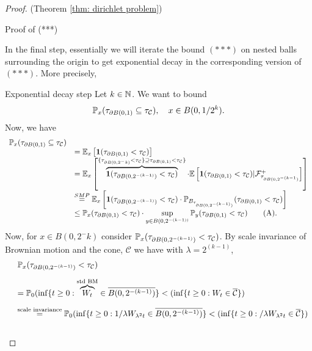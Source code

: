 \documentclass{article}
\begin{document}
\begin{proof}{(Theorem \ref{thm: dirichlet problem})}
\begin{examplesblock}{Proof of (***)}
\end{examplesblock}

In the final step, essentially we will iterate the bound $ (***)$ on nested balls surrounding the origin to get exponential decay in the corresponding version of $ (***)$. More precisely, 

\begin{examplesblock}{Exponential decay step}\label{aside: poincare cone decay bound}
Let $ k\in \mathbb{N}$. We want to bound 
\[
\mathbb{P}_{x}(\tau_{\partial B(0,1)}\subseteq \tau_{ \mathcal{C}}), \quad x\in B(0, 1/2^k).
\]
Now, we have 
\[
\begin{array}{ll}
	\mathbb{P}_{x}(\tau_{\partial B(0,1)}\subseteq \tau_{ \mathcal{C}})&\\ 
	&= \mathbb{E}_{x}\left[ \mathbf{1}(\tau_{\partial B(0,1)}<\tau_{\mathcal{C}}) \right] \\
								&= \mathbb{E}_{x}\left[ \overbrace{\mathbf{1}(\tau_{\partial B(0,2^{-(k-1)})}<\tau_{\mathcal{C}})}^{\{\tau_{\partial B(0, 2^-k)}<\tau_{ \mathcal{C}}\}\supseteq \tau_{\partial B(0, 1)}<\tau_{ \mathcal{C}}\}}\cdot \mathbb{E}\left[ \mathbf{1}(\tau_{\partial B(0,1)}<\tau_{ \mathcal{C}})|\mathcal{F}^{+}_{\tau_{\partial B(0, 2^{-(k-1})}} \right] \right]\\ 
								&\stackrel{SMP}{=} \mathbb{E}_{x}\left[ \mathbf{1}(\tau_{\partial B(0,2^{-(k-1)})}<\tau_{\mathcal{C}}) \cdot \mathbb{P}_{B_{\tau_{\partial B(0,2^{-(k-1)})}}}(\tau_{\partial B(0,1)}<\tau_{ \mathcal{C}})\right]\\ 
								&\leq \mathbb{P}_{x}(\tau_{\partial B(0,1)}<\tau_{ \mathcal{C}})\cdot \displaystyle\sup_{y\in B(0, 2^{-(k-1))}}\mathbb{P}_{y}(\tau_{\partial B(0,1)}<\tau_{ \mathcal{C}})\tag{A}.
\end{array}
\]
Now, for $ x\in B(0, 2^-k)$ consider $ \mathbb{P}_{x}(\tau_{\partial B(0, 2^{-(k-1)})}<\tau_{ \mathcal{C}})$. By scale invariance of Brownian motion and the cone, $ \mathcal{C}$ we have with $ \lambda = 2^{(k-1)}$, 
\[
\begin{array}{ll}
&\mathbb{P}_{x}(\tau_{\partial B(0, 2^{-(k-1)})}<\tau_{ \mathcal{C}})\\[10pt]
&= \mathbb{P}_{0}(\displaystyle\inf\{t\geq 0: \overbrace{W_{t}}^{\text{std BM}} \in \overline{B(0, 2^{-(k-1)})}\}<(\displaystyle\inf\{t\geq 0: W_{t} \in \overline{ \mathcal{C}}\}) \\[10pt]
&\stackrel{\text{scale invariance}}{=} \mathbb{P}_{0}(\displaystyle\inf\{t\geq 0: 1/\lambda W_{\lambda^{2}t} \in \overline{B(0, 2^{-(k-1)})}\}<(\displaystyle\inf\{t\geq 0: /\lambda W_{\lambda^{2}t} \in \overline{ \mathcal{C}}\}) \\[10pt]

\end{array}\]
\end{examplesblock}
\end{proof}
\end{document}
